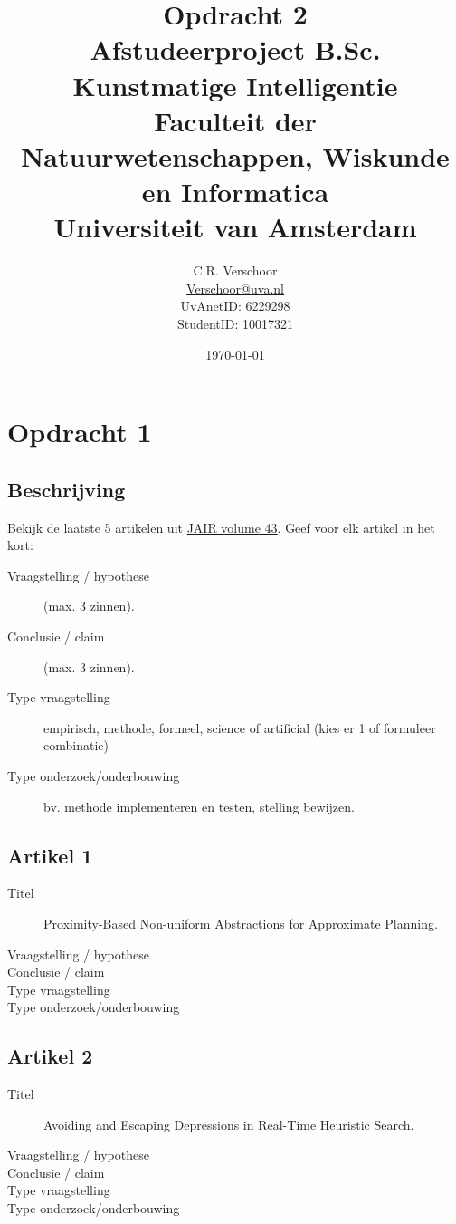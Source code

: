 \documentclass{article}
\title{Opdracht 2\\\large Afstudeerproject B.Sc. Kunstmatige Intelligentie\\Faculteit der Natuurwetenschappen, Wiskunde en Informatica\\
Universiteit van Amsterdam}
\date{\today}
\author{C.R. Verschoor\\\href{mailto:Verschoor@uva.nl}{Verschoor@uva.nl}\\UvAnetID: 6229298\\StudentID: 10017321}
\begin{document}
\maketitle

\section{Opdracht 1}
\subsection*{Beschrijving}
Bekijk de laatste 5 artikelen uit \href{http://www.jair.org/vol/vol43.html}{JAIR volume 43}. Geef voor elk artikel in het kort:
\begin{description}
\item[Vraagstelling / hypothese] (max. 3 zinnen).
\item[Conclusie / claim] (max. 3 zinnen).
\item[Type vraagstelling] empirisch, methode, formeel, science of artificial (kies er 1 of formuleer combinatie)
\item[Type onderzoek/onderbouwing] bv. methode implementeren en testen, stelling bewijzen.
\end{description}

\subsection{Artikel 1}
\begin{description}
\item[Titel] Proximity-Based Non-uniform Abstractions for Approximate Planning.
\item[Vraagstelling / hypothese] 
\item[Conclusie / claim] 
\item[Type vraagstelling]
\item[Type onderzoek/onderbouwing]
\end{description}

\subsection{Artikel 2}
\begin{description}
\item[Titel] Avoiding and Escaping Depressions in Real-Time Heuristic Search.
\item[Vraagstelling / hypothese] 
\item[Conclusie / claim] 
\item[Type vraagstelling]
\item[Type onderzoek/onderbouwing]
\end{description}
\end{document}
